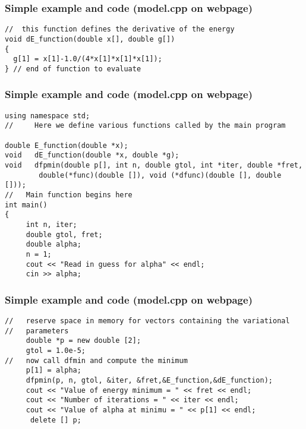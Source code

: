 \documentclass{beamer}
\begin{document}
\begin{frame}
\frametitle{Simple example and code (model.cpp on webpage)}

\begin{block}{}
\begin{verbatim}
//  this function defines the derivative of the energy 
void dE_function(double x[], double g[])
{
  g[1] = x[1]-1.0/(4*x[1]*x[1]*x[1]);
} // end of function to evaluate
\end{verbatim}
\end{block}
\end{frame}

\begin{frame}
\frametitle{Simple example and code (model.cpp on webpage)}

\begin{block}{}
\begin{verbatim}
using namespace std;
//     Here we define various functions called by the main program

double E_function(double *x);
void   dE_function(double *x, double *g);
void   dfpmin(double p[], int n, double gtol, int *iter, double *fret,
	    double(*func)(double []), void (*dfunc)(double [], double []));
//   Main function begins here
int main()
{
     int n, iter;
     double gtol, fret;
     double alpha;
     n = 1;
     cout << "Read in guess for alpha" << endl;
     cin >> alpha;
\end{verbatim}
\end{block}
\end{frame}

\begin{frame}
\frametitle{Simple example and code (model.cpp on webpage)}

\begin{block}{}
\begin{verbatim}
//   reserve space in memory for vectors containing the variational
//   parameters
     double *p = new double [2];
     gtol = 1.0e-5;
//   now call dfmin and compute the minimum
     p[1] = alpha;
     dfpmin(p, n, gtol, &iter, &fret,&E_function,&dE_function);
     cout << "Value of energy minimum = " << fret << endl;
     cout << "Number of iterations = " << iter << endl;
     cout << "Value of alpha at minimu = " << p[1] << endl;
      delete [] p;
\end{verbatim}
\end{block}
\end{frame}
\end{document}
